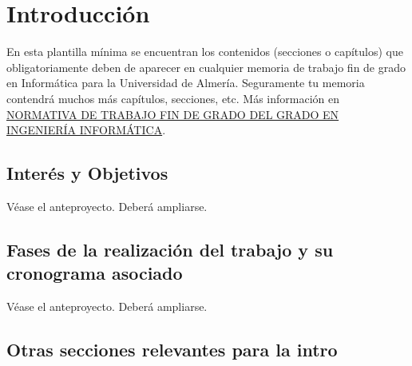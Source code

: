 \chapter{Introducción}
\label{intro}

En esta plantilla mínima se encuentran los contenidos (secciones o
capítulos) que obligatoriamente deben de aparecer en cualquier memoria
de trabajo fin de grado en Informática para la Universidad de
Almería. Seguramente tu memoria contendrá muchos más capítulos,
secciones, etc. Más información en
\href{http://cms.ual.es/idc/groups/public/@academica/@titulaciones/@centro/@politecnica/documents/documento/normativa_tfg_4010.pdf}{NORMATIVA
  DE TRABAJO FIN DE GRADO DEL GRADO EN INGENIERÍA INFORMÁTICA}.

\section{Interés y Objetivos}

Véase el anteproyecto. Deberá ampliarse.

\section{Fases de la realización del trabajo y su 
cronograma asociado}

Véase el anteproyecto. Deberá ampliarse.

\section{Otras secciones relevantes para la intro}

\lipsum[1-15]
